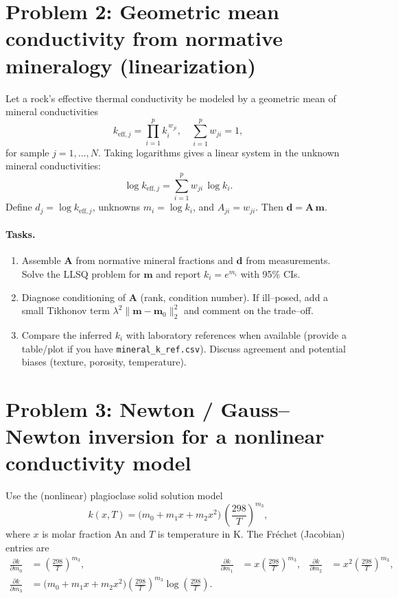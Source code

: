 \documentclass[11pt,a4paper]{article}
\begin{document}
\section{Problem 2: Geometric mean conductivity from normative mineralogy (linearization)}
Let a rock's effective thermal conductivity be modeled by a geometric mean of mineral conductivities
\begin{equation}
  k_{\text{eff},j} = \prod_{i=1}^{p} k_i^{\,w_{j i}}, \quad \sum_{i=1}^{p} w_{j i} = 1, \label{eq:geom}
\end{equation}
for sample $j=1,\dots,N$. Taking logarithms gives a linear system in the unknown mineral conductivities:
\begin{equation}
  \log k_{\text{eff},j} = \sum_{i=1}^{p} w_{j i}\, \log k_i. \label{eq:lin}
\end{equation}
Define $d_j = \log k_{\text{eff},j}$, unknowns $m_i = \log k_i$, and $A_{j i} = w_{j i}$. Then $\mathbf d = \mathbf A\,\mathbf m$.

\paragraph{Tasks.}
\begin{enumerate}
  \item Assemble $\mathbf A$ from normative mineral fractions and $\mathbf d$ from measurements. Solve the LLSQ problem for $\mathbf m$ and report $k_i = e^{m_i}$ with 95\% CIs.
  \item Diagnose conditioning of $\mathbf A$ (rank, condition number). If ill--posed, add a small Tikhonov term $\lambda^2\lVert\mathbf m-\mathbf m_0\rVert_2^2$ and comment on the trade--off.
  \item Compare the inferred $k_i$ with laboratory references when available (provide a table/plot if you have \texttt{mineral\_k\_ref.csv}). Discuss agreement and potential biases (texture, porosity, temperature).
\end{enumerate}

\section{Problem 3: Newton / Gauss--Newton inversion for a nonlinear conductivity model}
Use the (nonlinear) plagioclase solid solution model
\begin{equation}
  k(x,T) = \big(m_0 + m_1 x + m_2 x^2\big)\,\left(\frac{298}{T}\right)^{m_3}, \label{eq:model}
\end{equation}
where $x$ is molar fraction An and $T$ is temperature in K. The Fr\'echet (Jacobian) entries are
\begin{align}
  \frac{\partial k}{\partial m_0} &= \left(\frac{298}{T}\right)^{m_3}, &
  \frac{\partial k}{\partial m_1} &= x\left(\frac{298}{T}\right)^{m_3}, &
  \frac{\partial k}{\partial m_2} &= x^2\left(\frac{298}{T}\right)^{m_3}, \\
  \frac{\partial k}{\partial m_3} &= \big(m_0 + m_1 x + m_2 x^2\big)\left(\frac{298}{T}\right)^{m_3} \log\!\left(\frac{298}{T}\right). \label{eq:jac}
\end{align}
\end{document}
